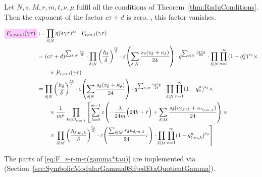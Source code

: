 \documentclass{article}
\begin{document}
Let $N, s, M, r, m, t, \nu, \mu$ fulfil all the conditions of
Theorem~\ref{thm:RaduConditions}. Then the exponent of the factor
$c\tau+d$ is zero, \ie, this factor vanishes.

\begin{align}
  \defineNotation[F-s-r-m-t-gamma-tau]{F_{s,r,m,t}(\gamma\tau)}
  &:= \divisorprod{N} \eta(\delta\gamma\tau)^{s_\delta}
    \cdot
    P_{r, m, t}(\gamma\tau)
  \notag\\
  &=
  (c\tau+d)^{\divisorsum{N} \frac{s_\delta}{2}}
  \cdot
  \divisorprod{N}
  \left(\frac{h_\delta}{\delta}\right)^{\!\frac{s_\delta}{2}}
  \cdot
  \unityPower{\divisorsum{N} \frac{s_\delta(v_\delta + \kappa_\delta)}{24}}
  \cdot
  q^{\divisorsum{N} \frac{s_\delta u_\delta}{24}}
  \cdot
    \divisorprod{N} \prod_{n=1}^{\infty}(1-q_\delta^n)^{s_\delta} \times\notag\\
  &\qquad\times
    P_{r, m, t}(\gamma\tau)
  \notag\\
  &=
  \divisorprod{N}
  \left(\frac{h_\delta}{\delta}\right)^{\!\frac{s_\delta}{2}}
  \cdot
  \unityPower{\divisorsum{N} \frac{s_\delta(v_\delta + \kappa_\delta)}{24}}
  \cdot
  q^{\divisorsum{N} \frac{s_\delta u_\delta}{24}}
    \cdot
    \divisorprod{N} \prod_{n=1}^{\infty}(1-q_\delta^n)^{s_\delta} \times\notag\\
  &\qquad\times
    \frac{1}{m^\mu}
    \prod_{k\in \modularOrbit{r,m,t}}
    \left[\sum_{\lambda=0}^{m-1}
    \unityPower{-\frac{\lambda}{24m}\Bigl(24k+\sumdelta{r}\Bigr)
    + \divisorsum{M}\frac{s_\delta(v_{\delta,m\lambda} +
    \kappa_{\gamma_{\delta,m,\lambda}})}{24}} \times\right.\notag\\
  &\qquad\times
    \left.
    \divisorprod{M}
    \left(\frac{h_{\delta,m,\lambda}}{\delta}\right)^{\!\frac{r_\delta}{2}}
    \cdot
    \unityPower{\frac{\divisorsum{M} r_\delta u_{\delta,m,\lambda}}{24}\tau}
    \cdot
    \divisorprod{M} \prod_{n=1}^\infty (1-q_{\delta,m,\lambda}^n)^{r_\delta}
    \right]
    \label{eq:F_s-r-m-t(gamma*tau)}
\end{align}


The parts of \eqref{eq:F_s-r-m-t(gamma*tau)} are implemented via
\textcolor{blue}{}
(Section~\ref{sec:SymbolicModularGamma0SiftedEtaQuotientGamma}).
\end{document}
